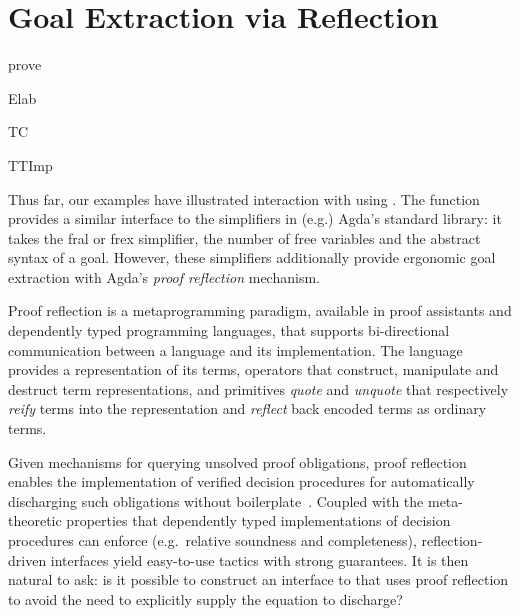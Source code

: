 \section{Goal Extraction via Reflection}
\newcommand\prove[1][]{\UseVerb[#1]{prove}}
\begin{SaveVerbatim}[commandchars=\\\{\}]{prove}
\end{SaveVerbatim}

\newcommand\Elab[1][]{\UseVerb[#1]{Elab}}
\begin{SaveVerbatim}[commandchars=\\\{\}]{Elab}
\end{SaveVerbatim}

\newcommand\TC[1][]{\UseVerb[#1]{TC}}
\begin{SaveVerbatim}[commandchars=\\\{\}]{TC}
\end{SaveVerbatim}

\newcommand\TTImp[1][]{\UseVerb[#1]{TTImp}}
\begin{SaveVerbatim}[commandchars=\\\{\}]{TTImp}
\end{SaveVerbatim}

Thus far, our examples have illustrated interaction with \Frexlib{}
using \solve{}. The \solve{} function provides a similar interface to
the simplifiers in (e.g.)  Agda's standard library: it takes the fral
or frex simplifier, the number of free variables and the abstract
syntax of a goal. However, these simplifiers additionally provide
ergonomic goal extraction with Agda's \emph{proof reflection}
mechanism.

Proof reflection is a metaprogramming paradigm, available in
proof assistants and dependently typed programming languages, that
supports bi-directional communication between a language and its
implementation. The language provides
a representation of its terms,
operators that construct, manipulate and destruct term representations, and
primitives \emph{quote} and \emph{unquote} that respectively
\emph{reify} terms into the representation and
\emph{reflect} back encoded terms as ordinary terms.

Given mechanisms for querying unsolved proof obligations, proof
reflection enables the implementation of verified decision procedures
for automatically discharging such obligations without
boilerplate~\cite{boutin:reflection,christiansen-et-al:elab-reflection}.
Coupled with the meta-theoretic properties that
dependently typed implementations of decision procedures can enforce
(e.g.~relative soundness and completeness), reflection-driven interfaces
yield easy-to-use tactics with strong guarantees. It is then natural to
ask: is it possible to construct an interface to \Frexlib{}
that uses proof reflection to avoid the need to explicitly supply the
equation to discharge?

